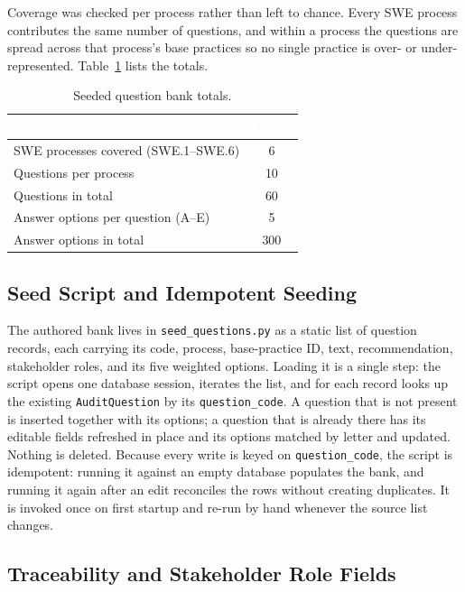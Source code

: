 \documentclass[a4paper, 12pt, oneside, openany, BCOR1cm,toc=chapterentrywithdots]{scrbook}
\newcommand{\thw}[1]{\textcolor{white}{\textbf{#1}}}
\begin{document}
Coverage was checked per process rather than left to chance. Every SWE process contributes the
same number of questions, and within a process the questions are spread across that process's
base practices so no single practice is over- or under-represented. Table~\ref{tab:qb-counts}
lists the totals.

\begin{table}[h]
\centering
{}
\begin{tabular}{l c}
\toprule
\rowcolor{green!55!black}
\thw{Item} & \thw{Count} \\
\midrule
SWE processes covered (SWE.1--SWE.6) & 6 \\
Questions per process & 10 \\
Questions in total & 60 \\
Answer options per question (A--E) & 5 \\
Answer options in total & 300 \\
\bottomrule
\end{tabular}
\caption{Seeded question bank totals.}
\label{tab:qb-counts}
\end{table}

\subsection{Seed Script and Idempotent Seeding}

The authored bank lives in \texttt{seed\_questions.py} as a static list of question records,
each carrying its code, process, base-practice ID, text, recommendation, stakeholder roles, and
its five weighted options. Loading it is a single step: the script opens one database session,
iterates the list, and for each record looks up the existing \texttt{AuditQuestion} by its
\texttt{question\_code}. A question that is not present is inserted together with its options; a
question that is already there has its editable fields refreshed in place and its options
matched by letter and updated. Nothing is deleted. Because every write is keyed on
\texttt{question\_code}, the script is idempotent: running it against an empty database
populates the bank, and running it again after an edit reconciles the rows without creating
duplicates. It is invoked once on first startup and re-run by hand whenever the source list
changes.

\subsection{Traceability and Stakeholder Role Fields}
\end{document}
